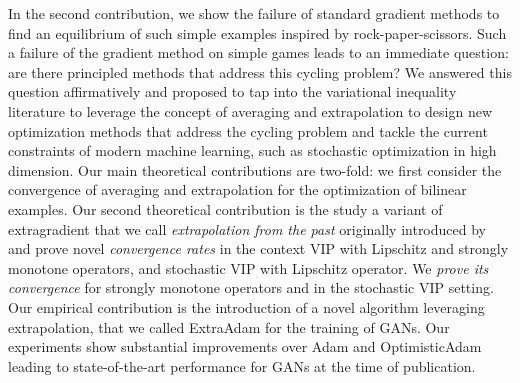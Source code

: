 In the second contribution, we show the failure of standard gradient methods to find an equilibrium of such simple examples inspired by rock-paper-scissors. 
Such a failure of the gradient method on simple games leads to an immediate question: are there principled methods that address this cycling problem? We answered this question affirmatively and proposed to tap into the variational inequality literature to leverage the concept of averaging and extrapolation to design new optimization methods that address the cycling problem and tackle the current constraints of modern machine learning, such as stochastic optimization in high dimension. 
Our main theoretical contributions are two-fold: we first consider the convergence of averaging and extrapolation for the optimization of bilinear examples. Our second theoretical contribution is the study a variant of extragradient that we call \emph{extrapolation from the past} originally introduced by~\citet{popov1980modification} and prove novel \emph{convergence rates} in the context VIP with Lipschitz and strongly monotone operators, and stochastic VIP with Lipschitz operator. 
We \emph{prove its convergence} for strongly monotone operators and in the stochastic VIP setting. Our empirical contribution is the introduction of a novel algorithm leveraging extrapolation, that we called ExtraAdam for the training of GANs. Our experiments show substantial improvements over Adam and OptimisticAdam~\citep{daskalakis2017training} leading to state-of-the-art performance for GANs at the time of publication. 

